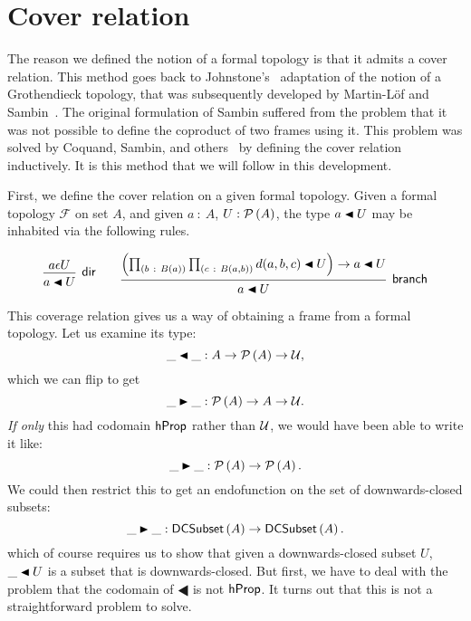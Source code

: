 \section{Cover relation}

 The reason we defined the
notion of a formal topology is that it admits a cover relation. This method goes back to
Johnstone's~\cite{stone-spaces} adaptation of the notion of a Grothendieck topology, that
was subsequently developed by Martin-L\"{o}f and Sambin~\cite{int-formal-spaces}. The
original formulation of Sambin suffered from the problem that it was not possible to
define the coproduct of two frames using it. This problem was solved by Coquand, Sambin,
and others~\cite{coq-sambin} by defining the cover relation inductively. It is this method
that we will follow in this development.

First, we define the cover relation on a given formal topology. Given a formal topology
$\mathcal{F}$ on set $A$, and given $a~:~A$, $U : \mathcal{P}\left(A\right)$, the type $\covers{a}{U}$ may
be inhabited via the following rules.
\begin{defn}
  \[
  \begin{prooftree}
    \hypo{ a \epsilon U }
    \infer1[\textsf{dir}]{\covers{a}{U}}
  \end{prooftree}
  \qquad
  \begin{prooftree}
    \hypo{ \left(
      \pity{b}{B(a)}{
        \pity{c}{B(a, b)}{\covers{d(a, b, c)}{U}} \right) \rightarrow \covers{a}{U}
      }
    }
    \infer1[\textsf{branch}]{\covers{a}{U}}
  \end{prooftree}
  \]
\end{defn}

This coverage relation gives us a way of obtaining a frame from a formal topology. Let us
examine its type:
\begin{equation*}
  \_\covernm{}\_ : A \rightarrow \pow{A} \rightarrow \univ{},
\end{equation*}
which we can flip to get
\begin{equation*}
  \_\RHD\_ : \pow{A} \rightarrow A \rightarrow \univ{}.
\end{equation*}
\emph{If only} this had codomain $\mathsf{hProp}{}$ rather than $\mathcal{U}{}$, we would have been able
to write it like:
\begin{equation*}
  \_\RHD\_ : \pow{A} \rightarrow \pow{A}.
\end{equation*}
We could then restrict this to get an endofunction on the set of downwards-closed subsets:
\begin{equation*}
  \_\RHD\_ : \dcsubset{A} \rightarrow \dcsubset{A}.
\end{equation*}
which of course requires us to show that given a downwards-closed subset $U$,
$\covers{\_}{U}$ is a subset that is downwards-closed. But first, we have to deal with the
problem that the codomain of $\LHD$ is not $\mathsf{hProp}{}$. It turns out that this is not a
straightforward problem to solve.

